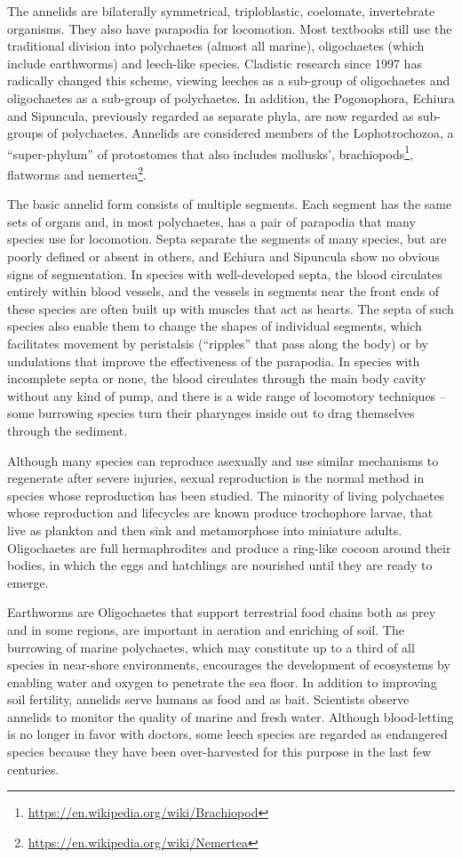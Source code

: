 \documentclass[]{book}
\let\rmarkdownfootnote\footnote%
\def\footnote{\protect\rmarkdownfootnote}
\renewcommand{\href}[2]{#2\footnote{\url{#1}}}
\begin{document}
The annelids are bilaterally symmetrical, triploblastic, coelomate, invertebrate organisms. They also have parapodia for locomotion. Most textbooks still use the traditional division into polychaetes (almost all marine), oligochaetes (which include earthworms) and leech-like species. Cladistic research since 1997 has radically changed this scheme, viewing leeches as a sub-group of oligochaetes and oligochaetes as a sub-group of polychaetes. In addition, the Pogonophora, Echiura and Sipuncula, previously regarded as separate phyla, are now regarded as sub-groups of polychaetes. Annelids are considered members of the Lophotrochozoa, a ``super-phylum'' of protostomes that also includes mollusks', \href{https://en.wikipedia.org/wiki/Brachiopod}{brachiopods}, flatworms and \href{https://en.wikipedia.org/wiki/Nemertea}{nemertea}.

The basic annelid form consists of multiple segments. Each segment has the same sets of organs and, in most polychaetes, has a pair of parapodia that many species use for locomotion. Septa separate the segments of many species, but are poorly defined or absent in others, and Echiura and Sipuncula show no obvious signs of segmentation. In species with well-developed septa, the blood circulates entirely within blood vessels, and the vessels in segments near the front ends of these species are often built up with muscles that act as hearts. The septa of such species also enable them to change the shapes of individual segments, which facilitates movement by peristalsis (``ripples'' that pass along the body) or by undulations that improve the effectiveness of the parapodia. In species with incomplete septa or none, the blood circulates through the main body cavity without any kind of pump, and there is a wide range of locomotory techniques -- some burrowing species turn their pharynges inside out to drag themselves through the sediment.

Although many species can reproduce asexually and use similar mechanisms to regenerate after severe injuries, sexual reproduction is the normal method in species whose reproduction has been studied. The minority of living polychaetes whose reproduction and lifecycles are known produce trochophore larvae, that live as plankton and then sink and metamorphose into miniature adults. Oligochaetes are full hermaphrodites and produce a ring-like cocoon around their bodies, in which the eggs and hatchlings are nourished until they are ready to emerge.

Earthworms are Oligochaetes that support terrestrial food chains both as prey and in some regions, are important in aeration and enriching of soil. The burrowing of marine polychaetes, which may constitute up to a third of all species in near-shore environments, encourages the development of ecosystems by enabling water and oxygen to penetrate the sea floor. In addition to improving soil fertility, annelids serve humans as food and as bait. Scientists observe annelids to monitor the quality of marine and fresh water. Although blood-letting is no longer in favor with doctors, some leech species are regarded as endangered species because they have been over-harvested for this purpose in the last few centuries.
\end{document}
